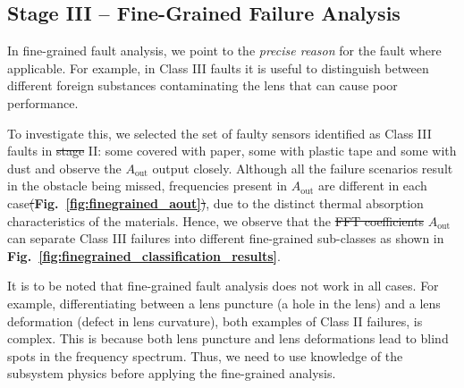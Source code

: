 \documentclass[manuscript,screen,review]{acmart} %
\newif \ifdraft
\newcommand{\ins}[1]{\ifdraft \textcolor{red}{#1} \else \fi}
\newcommand{\aout}{$A_{\text{out}}$\xspace}
\providecommand{\DIFadd}[1]{{\protect\color{blue}\uwave{#1}}} %
\providecommand{\DIFdel}[1]{{\protect\color{red}\sout{#1}}}                      %
\providecommand{\DIFaddbegin}{} %
\providecommand{\DIFaddend}{} %
\providecommand{\DIFdelbegin}{} %
\providecommand{\DIFdelend}{} %
\newcommand{\DIFscaledelfig}{0.5}
\newlength{\DIFdelgraphicswidth} %
\newlength{\DIFdelgraphicsheight} %
\newcommand{\DIFaddincludegraphics}[2][]{{\color{blue}\fbox{\DIFOincludegraphics[#1]{#2}}}} %
\newcommand{\DIFdelincludegraphics}[2][]{%
\sbox{\DIFdelgraphicsbox}{\DIFOincludegraphics[#1]{#2}}%
\settoboxwidth{\DIFdelgraphicswidth}{\DIFdelgraphicsbox} %
\settoboxtotalheight{\DIFdelgraphicsheight}{\DIFdelgraphicsbox} %
\scalebox{\DIFscaledelfig}{%
\parbox[b]{\DIFdelgraphicswidth}{\usebox{\DIFdelgraphicsbox}\\[-\baselineskip] \rule{\DIFdelgraphicswidth}{0em}}\llap{\resizebox{\DIFdelgraphicswidth}{\DIFdelgraphicsheight}{%
\setlength{\unitlength}{\DIFdelgraphicswidth}%
\begin{picture}(1,1)%
\thicklines\linethickness{2pt} %
{\color[rgb]{1,0,0}\put(0,0){\framebox(1,1){}}}%
{\color[rgb]{1,0,0}\put(0,0){\line( 1,1){1}}}%
{\color[rgb]{1,0,0}\put(0,1){\line(1,-1){1}}}%
\end{picture}%
}\hspace*{3pt}}} %
} %
\DeclareRobustCommand{\DIFaddbegin}{\DIFOaddbegin \let\includegraphics\DIFaddincludegraphics} %
\DeclareRobustCommand{\DIFaddend}{\DIFOaddend \let\includegraphics\DIFOincludegraphics} %
\DeclareRobustCommand{\DIFdelbegin}{\DIFOdelbegin \let\includegraphics\DIFdelincludegraphics} %
\DeclareRobustCommand{\DIFdelend}{\DIFOaddend \let\includegraphics\DIFOincludegraphics} %
\begin{document}

\subsection{Stage III -- Fine-Grained Failure Analysis} In fine-grained fault analysis, we point to the \textit{precise reason} for the fault where applicable. For example, in Class III faults it is useful to distinguish between different foreign substances contaminating the lens that can cause poor performance.




To investigate this, we selected the set of faulty sensors identified as Class III faults in 
\DIFdelbegin \DIFdel{stage }\DIFdelend \DIFaddbegin \DIFadd{Stage }\DIFaddend II: some covered with paper, some with plastic tape and some with dust and observe the \aout output closely. 
Although all the failure scenarios result in the obstacle being missed, frequencies present in \aout are different in each case\DIFdelbegin \DIFdel{(}\DIFdelend \DIFaddbegin \DIFadd{, as shown in }\DIFaddend {\bfseries Fig.~\ref{fig:finegrained_aout}}\DIFdelbegin \DIFdel{)}\DIFdelend , due to the distinct thermal absorption characteristics of the materials.
Hence, we observe that the \DIFdelbegin \DIFdel{FFT coefficients }\DIFdelend \DIFaddbegin \aout \DIFadd{features }\DIFaddend can separate Class III failures into different fine-grained sub-classes as shown in {\bfseries Fig.~\ref{fig:finegrained_classification_results}}. 

It is to be noted that fine-grained fault analysis does not work in all cases.
For example, differentiating between a lens puncture (a hole in the lens) and a lens deformation (defect in lens curvature), both examples of Class II failures, is complex. 
This is because both lens puncture and lens deformations lead to blind spots in the frequency spectrum. 
Thus, we need to use knowledge of the subsystem physics before applying the fine-grained analysis.
\end{document}
